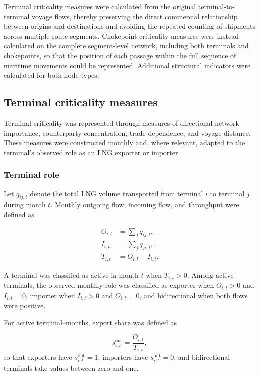 \documentclass[pdftex,12pt,openright,a4paper,oneside]{book}
\begin{document}
Terminal criticality measures were calculated from the original terminal-to-terminal voyage flows, thereby preserving the direct commercial relationship between origins and destinations and avoiding the repeated counting of shipments across multiple route segments. 
Chokepoint criticality measures were instead calculated on the complete segment-level network, including both terminals and chokepoints, so that the position of each passage within the full sequence of maritime movements could be represented. 
Additional structural indicators were calculated for both node types.

\subsection{Terminal criticality measures}
\label{subsec:terminal_measures}
Terminal criticality was represented through measures of directional network importance, counterparty concentration, trade dependence, and voyage distance. 
These measures were constructed monthly and, where relevant, adapted to the terminal's observed role as an LNG exporter or importer.

\subsubsection{Terminal role}
Let \(q_{ij,t}\) denote the total LNG volume transported from terminal \(i\) to terminal \(j\) during month \(t\). 
Monthly outgoing flow, incoming flow, and throughput were defined as

\begin{equation}
\begin{aligned}
O_{i,t} &= \sum_j q_{ij,t}, \\
I_{i,t} &= \sum_j q_{ji,t}, \\
T_{i,t} &= O_{i,t}+I_{i,t}.
\end{aligned}
\label{eq:terminal_flows}
\end{equation}

A terminal was classified as active in month \(t\) when \(T_{i,t}>0\). Among active terminals, the observed monthly role was classified as exporter when \(O_{i,t}>0\) and \(I_{i,t}=0\), importer when \(I_{i,t}>0\) and \(O_{i,t}=0\), and bidirectional when both flows were positive.

For active terminal--months, export share was defined as

\begin{equation}
s^{\mathrm{out}}_{i,t}
=
\frac{O_{i,t}}{T_{i,t}},
\label{eq:export_share}
\end{equation}
so that exporters have \(s^{\mathrm{out}}_{i,t}=1\), importers have \(s^{\mathrm{out}}_{i,t}=0\), and bidirectional terminals take values between zero and one.
\end{document}
